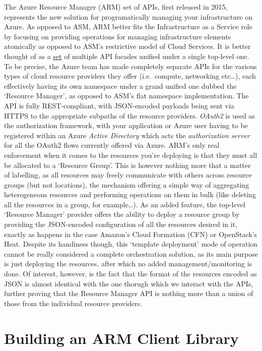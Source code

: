 \documentclass[11pt]{report}
\begin{document}
The Azure Resource Manager (ARM) set of APIs, first released in 2015,
represents the new solution for programatically managing your infrastructure on
Azure. As opposed to ASM, ARM better fits the Infrastructure as a Service
role by focusing on providing operations for managing infrastructure elements
atomically as opposed to ASM's restrictive model of Cloud Services. It is better
thought of as a \underline{set} of multiple API facades unified under a single
top-level one. To be precise, the Azure team has made completely separate APIs
for the various types of cloud resource providers they offer (i.e.\ compute,
networking etc\ldots), each effectively having its own namespace under a grand
unified one dubbed the `Resource Manager', as opposed to ASM's flat namespace
implementation. The API is fully REST-compliant, with JSON-encoded payloads
being sent via HTTPS to the appropriate subpaths of the resource providers.
\textit{OAuth2} is used as the authorization framework, with your application
or Azure user having to be registered within an Azure \textit{Active
Directory} which acts the \textit{authorization server} for all the OAuth2
flows currently offered via Azure. \newline
ARM's only real enforcement when it comes to the resources you're deploying is
that they must all be allocated to a `Resource Group'. This is however nothing
more that a matter of labelling, as all resources may freely communicate with
others across resource groups (but not locations), the mechanism offering a
simple way of aggregating heterogeneous resources and performing operations on
them in bulk (like deleting all the resources in a group, for example\ldots).
\newline
As an added feature, the top-level `Resource Manager' provider offers the
ability to deploy a resource group by providing the JSON-encoded configuration
of all the resources desired in it, exactly as happens in the case Amazon's
Cloud Formation (CFN) or OpenStack's Heat. Despite its handiness though, this
`template deployment' mode of operation cannot be really considered a complete
orchestration solution, as its main purpose is just deploying the resources,
after which no added management/monitoring is done. Of interest, however, is
the fact that the format of the resources encoded as JSON is almost identical
with the one thorugh which we interact with the APIs, further proving that the
Resource Manager API is nothing more than a union of those from the individual
resource providers.

\section{Building an ARM Client Library}
\end{document}
